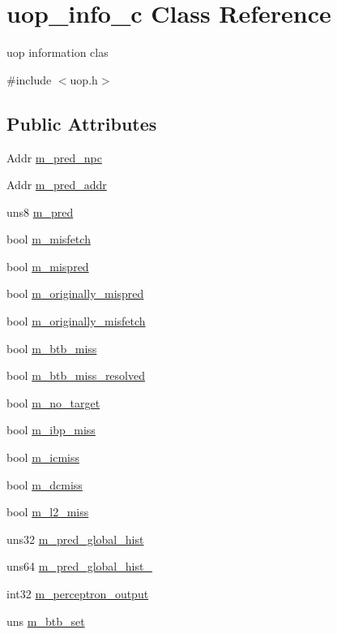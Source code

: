\hypertarget{classuop__info__c}{
\section{uop\_\-info\_\-c Class Reference}
\label{classuop__info__c}
}


uop information clas  




{\ttfamily \#include $<$uop.h$>$}

\subsection*{Public Attributes}
\begin{DoxyCompactItemize}
\item 
Addr \hyperlink{classuop__info__c_a1883bff1246169e7e708cb8fabeb398b}{m\_\-pred\_\-npc}
\item 
Addr \hyperlink{classuop__info__c_ad6ede550d93c48f32cb874e2a0bc68bd}{m\_\-pred\_\-addr}
\item 
uns8 \hyperlink{classuop__info__c_acc5127f54e0c7be5ef209831d059c7f4}{m\_\-pred}
\item 
bool \hyperlink{classuop__info__c_a8f11ffb370bdf4a86d78f75ed1c5d65c}{m\_\-misfetch}
\item 
bool \hyperlink{classuop__info__c_aa8c135a846af6e973cab44b6527ae96a}{m\_\-mispred}
\item 
bool \hyperlink{classuop__info__c_a914f7457415859152e3b63e8cc3e6f6c}{m\_\-originally\_\-mispred}
\item 
bool \hyperlink{classuop__info__c_a9e508d92a0b1921a98148b3f920dda7f}{m\_\-originally\_\-misfetch}
\item 
bool \hyperlink{classuop__info__c_a231581e8274014ca0eee3503645e2c96}{m\_\-btb\_\-miss}
\item 
bool \hyperlink{classuop__info__c_abe0421cd826cb800793f16eaf1806eb1}{m\_\-btb\_\-miss\_\-resolved}
\item 
bool \hyperlink{classuop__info__c_a7224054a99355aa84ccdb62549837145}{m\_\-no\_\-target}
\item 
bool \hyperlink{classuop__info__c_aeaf923369a4504419d5f27cc346fa36e}{m\_\-ibp\_\-miss}
\item 
bool \hyperlink{classuop__info__c_ad6c8da616dd80c531b797c1f2880268c}{m\_\-icmiss}
\item 
bool \hyperlink{classuop__info__c_ad554638974bb5d439d74557a13d3aa71}{m\_\-dcmiss}
\item 
bool \hyperlink{classuop__info__c_ac226c2e89b9c9451b5c634e7ca444434}{m\_\-l2\_\-miss}
\item 
uns32 \hyperlink{classuop__info__c_ac822869e0b96565e5dbe0371aa1eac52}{m\_\-pred\_\-global\_\-hist}
\item 
uns64 \hyperlink{classuop__info__c_a719b31d7bef88146a4cfe2bb5e9712e5}{m\_\-pred\_\-global\_\-hist\_}
\item 
int32 \hyperlink{classuop__info__c_a2f7e5f232a3868929da19c5b7ef629a5}{m\_\-perceptron\_\-output}
\item 
uns \hyperlink{classuop__info__c_a2417e1507b9da6996274504e220655c0}{m\_\-btb\_\-set}
\end{DoxyCompactItemize}


